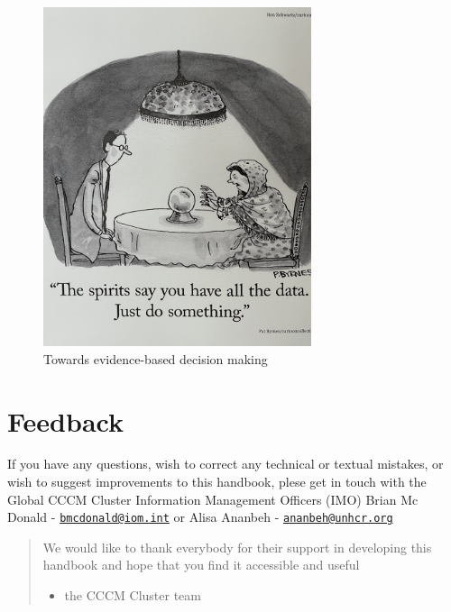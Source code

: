 \documentclass[
  a4paper,
  onecolumn,
  oneside]{book}
\providecommand{\tightlist}{%
  \setlength{\itemsep}{0pt}\setlength{\parskip}{0pt}}\usepackage{longtable,booktabs,array}
\begin{document}
\begin{figure}

{\centering \includegraphics[width=0.7\textwidth,height=\textheight]{./part1/images/spirits.jpg}

}

\caption{Towards evidence-based decision making}

\end{figure}

\hypertarget{feedback}{%
\section*{Feedback}\label{feedback}}


If you have any questions, wish to correct any technical or textual
mistakes, or wish to suggest improvements to this handbook, plese get in
touch with the Global CCCM Cluster Information Management Officers (IMO)
Brian Mc Donald -
\href{mailto:bmcdonald@iom.int}{\nolinkurl{bmcdonald@iom.int}} or Alisa
Ananbeh - \href{mailto:ananbeh@unhcr.org}{\nolinkurl{ananbeh@unhcr.org}}

\begin{quote}
We would like to thank everybody for their support in developing this
handbook and hope that you find it accessible and useful

\begin{itemize}
\tightlist
\item
  the CCCM Cluster team
\end{itemize}
\end{quote}
\end{document}
